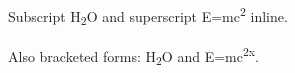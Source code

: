 Subscript H\textsubscript{2}O and superscript E=mc\textsuperscript{2} inline.

Also bracketed forms: H\textsubscript{2}O and E=mc\textsuperscript{2x}.


